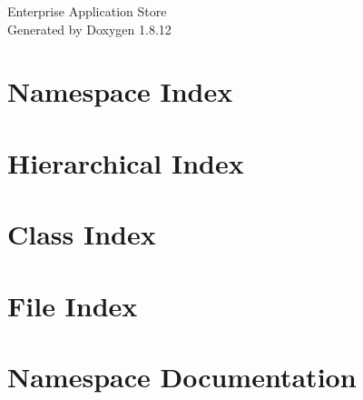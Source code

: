 \documentclass[twoside]{book}
\newcommand{\+}{\discretionary{\mbox{\scriptsize$\hookleftarrow$}}{}{}}
\newcommand{\clearemptydoublepage}{%
  \newpage{\pagestyle{empty}\cleardoublepage}%
}
\begin{document}
\hypersetup{pageanchor=false,
             bookmarksnumbered=true,
             pdfencoding=unicode
            }
\begin{titlepage}
\vspace*{7cm}
\begin{center}%
{\Large Enterprise Application Store }\\
\vspace*{1cm}
{\large Generated by Doxygen 1.8.12}\\
\end{center}
\end{titlepage}
\clearemptydoublepage
{}
\tableofcontents
\clearemptydoublepage
{}
\hypersetup{pageanchor=true}

\chapter{Namespace Index}

\chapter{Hierarchical Index}

\chapter{Class Index}

\chapter{File Index}

\chapter{Namespace Documentation}




















\end{document}
